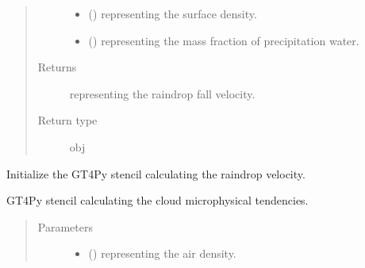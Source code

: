 \documentclass[letterpaper,10pt,english]{sphinxmanual}
\begin{document}
\begin{fulllineitems}
\begin{fulllineitems}
\begin{quote}
\begin{description}
\begin{itemize}
\item {} 
 () \textendash{}  representing the surface density.

\item {} 
 () \textendash{}  representing the mass fraction of precipitation water.

\end{itemize}

\item[{Returns}] \leavevmode
{} representing the raindrop fall velocity.

\item[{Return type}] \leavevmode
obj

\end{description}\end{quote}

\end{fulllineitems}


\begin{fulllineitems}
\label{\detokenize{api:tasmania.parameterizations.slow_tendency_microphysics_kessler_wrf_saturation.SlowTendencyMicrophysicsKesslerWRFSaturation._stencil_raindrop_fall_velocity_initialize}}
Initialize the GT4Py stencil calculating the raindrop velocity.

\end{fulllineitems}


\begin{fulllineitems}
\label{\detokenize{api:tasmania.parameterizations.slow_tendency_microphysics_kessler_wrf_saturation.SlowTendencyMicrophysicsKesslerWRFSaturation._stencil_tendency_defs}}
GT4Py stencil calculating the cloud microphysical tendencies.
\begin{quote}\begin{description}
\item[{Parameters}] \leavevmode\begin{itemize}
\item {} 
 () \textendash{}  representing the air density.


\end{itemize}
\end{description}
\end{quote}
\end{fulllineitems}
\end{fulllineitems}
\end{document}
